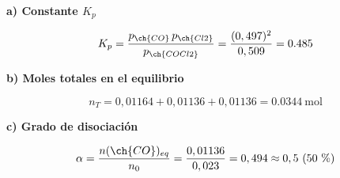 \begin{exerciseEVAU}
\begin{solu}
        \textbf{a) Constante \(K_p\)}

        \begin{equation*}
            K_p = \dfrac{p_{\ch{CO}}\, p_{\ch{Cl2}}}{p_{\ch{COCl2}}} = \dfrac{(0,497)^2}{0,509} = \num{0.485}
        \end{equation*}

        \textbf{b) Moles totales en el equilibrio}

        \begin{equation*}
            n_T = 0,01164 + 0,01136 + 0,01136 = \num{0.0344} \ \text{mol}
        \end{equation*}

        \textbf{c) Grado de disociación}

        \begin{equation*}
            \alpha = \dfrac{n(\ch{CO})_{eq}}{n_0} = \dfrac{0,01136}{0,023} = 0,494 \approx 0,5 \ (50\ \%)
        \end{equation*}

    \end{solu}


\end{exerciseEVAU}

